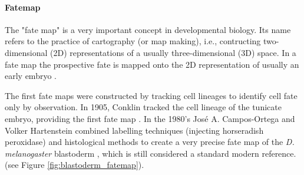 \clearpage
\begin{mdframed}[style=boxstyle,frametitle={Box1. Fate maps and gene expression maps }]
\label{Box2:Fatemap}

\paragraph{Fatemap}
The "fate map" is a very important concept in developmental biology. 
Its name refers to the practice of cartography (or map making), i.e., contructing two-dimensional (2D) representations of a usually three-dimensional (3D) space.
In a fate map the prospective fate is mapped onto the 2D representation of usually an early embryo \citep{gilbert2007fatemap}.

The first fate maps were constructed by tracking cell lineages to identify cell fate only by observation. In 1905, Conklin tracked the cell lineage of the tunicate embryo, providing the first fate map \citep{Conklin1905}. 
In the 1980's Jos\'{e} A. Campos-Ortega and Volker Hartenstein combined labelling techniques (injecting horseradish peroxidase) and histological methods to create a very precise fate map of the \textit{D. melanogaster} blastoderm \citep{Campos-Ortega1985}, which is still considered a standard modern reference.
(see Figure \ref{fig:blastoderm_fatemap}).


\end{mdframed}
